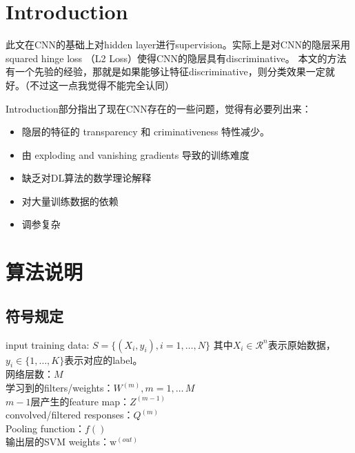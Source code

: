 \documentclass{article}
\begin{document}
\begin{CJK}{UTF8}{gbsn}
\LARGE
\section{Introduction}
此文在CNN的基础上对hidden layer进行supervision。实际上是对CNN的隐层采用squared hinge loss （L2 Loss）使得CNN的隐层具有discriminative。
本文的方法有一个先验的经验，那就是如果能够让特征discriminative，则分类效果一定就好。（不过这一点我觉得不能完全认同）

Introduction部分指出了现在CNN存在的一些问题，觉得有必要列出来：
\begin{itemize}
\item 隐层的特征的 transparency 和 criminativeness 特性减少。
\item 由 exploding and vanishing gradients 导致的训练难度
\item 缺乏对DL算法的数学理论解释
\item 对大量训练数据的依赖
\item 调参复杂
\end{itemize}

\section{算法说明}
\subsection{符号规定}
input training data: 
$S=\{(X_i,y_i),i=1,\dots,N\}$ 其中$X_i\in\mathcal{R}^n$表示原始数据，$y_i\in\{1,\dots,K\}$表示对应的label。\\
网络层数：$M$ \\
学习到的filters/weights：$W^{(m)},m=1,\dots\,M$ \\
$m-1$层产生的feature map：$Z^{(m-1)}$ \\
convolved/filtered responses：$Q^{(m)}$ \\
Pooling function：$f()$ \\
输出层的SVM weights：$\mathrm{w}^{(out)}$

\end{CJK}
\end{document}
